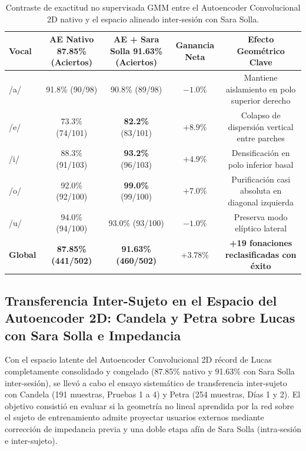 \documentclass[11pt,a4paper,openany]{book}
\theoremstyle{definition}
\begin{document}
\begin{table}[H]
\centering
\small
\begin{tabular}{lcccc}
\toprule
\textbf{Vocal} & \textbf{AE Nativo 87.85\% (Aciertos)} & \textbf{AE + Sara Solla 91.63\% (Aciertos)} & \textbf{Ganancia Neta} & \textbf{Efecto Geométrico Clave} \\
\midrule
/a/ & 91.8\% (90/98)  & 90.8\% (89/98)  & $-1.0\%$ & Mantiene aislamiento en polo superior derecho \\
/e/ & 73.3\% (74/101) & \textbf{82.2\%} (83/101) & $\mathbf{+8.9\%}$ & Colapso de dispersión vertical entre parches \\
/i/ & 88.3\% (91/103) & \textbf{93.2\%} (96/103) & $\mathbf{+4.9\%}$ & Densificación en polo inferior basal \\
/o/ & 92.0\% (92/100) & \textbf{99.0\%} (99/100) & $\mathbf{+7.0\%}$ & Purificación casi absoluta en diagonal izquierda \\
/u/ & 94.0\% (94/100) & 93.0\% (93/100) & $-1.0\%$ & Preserva modo elíptico lateral \\
\midrule
\textbf{Global} & \textbf{87.85\% (441/502)} & \textbf{91.63\% (460/502)} & $\mathbf{+3.78\%}$ & \textbf{+19 fonaciones reclasificadas con éxito} \\
\bottomrule
\end{tabular}
\caption{Contraste de exactitud no supervisada GMM entre el Autoencoder Convolucional 2D nativo y el espacio alineado inter-sesión con Sara Solla.}
\label{tab:desglose_ae_nativo_vs_solla}
\end{table}

\subsection{Transferencia Inter-Sujeto en el Espacio del Autoencoder 2D: Candela y Petra sobre Lucas con Sara Solla e Impedancia}
\label{subsec:transferencia_ae2d_tri_sujeto_sara_solla}

Con el espacio latente del Autoencoder Convolucional 2D récord de Lucas completamente consolidado y congelado (87.85\% nativo y 91.63\% con Sara Solla inter-sesión), se llevó a cabo el ensayo sistemático de transferencia inter-sujeto con Candela (191 muestras, Pruebas 1 a 4) y Petra (254 muestras, Días 1 y 2). El objetivo consistió en evaluar si la geometría no lineal aprendida por la red sobre el sujeto de entrenamiento admite proyectar usuarios externos mediante corrección de impedancia previa y una doble etapa afín de Sara Solla (intra-sesión e inter-sujeto).
\end{document}
